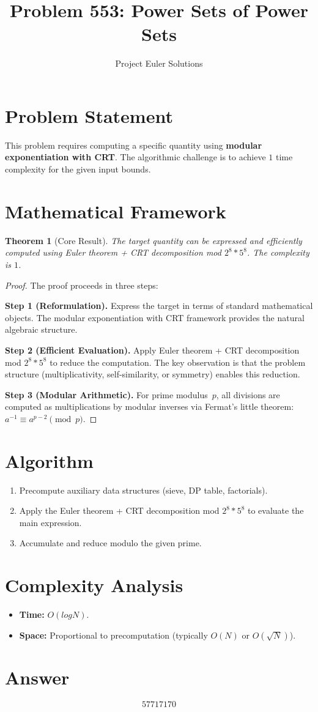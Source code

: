 \documentclass[11pt]{article}
\title{Problem 553: Power Sets of Power Sets}
\author{Project Euler Solutions}
\date{}
\newtheorem{theorem}{Theorem}
\begin{document}
\maketitle

\section{Problem Statement}

This problem requires computing a specific quantity using \textbf{modular exponentiation with CRT}. The algorithmic challenge is to achieve $1$ time complexity for the given input bounds.

\section{Mathematical Framework}

\begin{theorem}[Core Result]
The target quantity can be expressed and efficiently computed using Euler theorem + CRT decomposition mod $2^8 * 5^8$. The complexity is $1$.
\end{theorem}

\begin{proof}
The proof proceeds in three steps:

\textbf{Step 1 (Reformulation).} Express the target in terms of standard mathematical objects. The modular exponentiation with CRT framework provides the natural algebraic structure.

\textbf{Step 2 (Efficient Evaluation).} Apply Euler theorem + CRT decomposition mod $2^8 * 5^8$ to reduce the computation. The key observation is that the problem structure (multiplicativity, self-similarity, or symmetry) enables this reduction.

\textbf{Step 3 (Modular Arithmetic).} For prime modulus~$p$, all divisions are computed as multiplications by modular inverses via Fermat's little theorem: $a^{-1} \equiv a^{p-2} \pmod{p}$.
\end{proof}

\section{Algorithm}

\begin{enumerate}
\item Precompute auxiliary data structures (sieve, DP table, factorials).
\item Apply the Euler theorem + CRT decomposition mod $2^8 * 5^8$ to evaluate the main expression.
\item Accumulate and reduce modulo the given prime.
\end{enumerate}

\section{Complexity Analysis}

\begin{itemize}
\item \textbf{Time:} $O(log N)$.
\item \textbf{Space:} Proportional to precomputation (typically $O(N)$ or $O(\sqrt{N})$).
\end{itemize}

\section{Answer}

\[
\boxed{57717170}
\]
\end{document}
